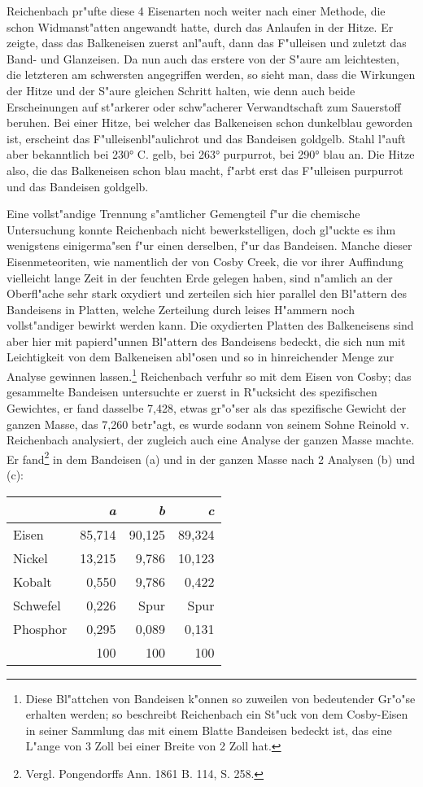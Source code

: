 \documentclass[a4paper, 11pt, oneside]{article}
\begin{document}
Reichenbach pr"ufte diese 4 Eisenarten noch weiter nach einer Methode, die schon Widmanst"atten angewandt hatte, durch das Anlaufen in der Hitze. Er zeigte, dass das Balkeneisen zuerst anl"auft, dann das F"ulleisen und zuletzt das Band- und Glanzeisen. Da nun auch das erstere von der S"aure am leichtesten, die letzteren am schwersten angegriffen werden, so sieht man, dass die Wirkungen der Hitze und der S"aure gleichen Schritt halten, wie denn auch beide Erscheinungen auf st"arkerer oder schw"acherer Verwandtschaft zum Sauerstoff beruhen. Bei einer Hitze, bei welcher das Balkeneisen schon dunkelblau geworden ist, erscheint das F"ulleisenbl"aulichrot und das Bandeisen goldgelb. Stahl l"auft aber bekanntlich bei 230° C. gelb, bei 263° purpurrot, bei 290° blau an. Die Hitze also, die das Balkeneisen schon blau macht, f"arbt erst das F"ulleisen purpurrot und das Bandeisen goldgelb.

Eine vollst"andige Trennung s"amtlicher Gemengteil f"ur die chemische Untersuchung konnte Reichenbach nicht bewerkstelligen, doch gl"uckte es ihm wenigstens einigerma"sen f"ur einen derselben, f"ur das Bandeisen. Manche dieser Eisenmeteoriten, wie namentlich der von Cosby Creek, die vor ihrer Auffindung vielleicht lange Zeit in der feuchten Erde gelegen haben, sind n"amlich an der Oberfl"ache sehr stark oxydiert und zerteilen sich hier parallel den Bl"attern des Bandeisens in Platten, welche Zerteilung durch leises H"ammern noch vollst"andiger bewirkt werden kann. Die oxydierten Platten des Balkeneisens sind aber hier mit papierd"unnen Bl"attern des Bandeisens bedeckt, die sich nun mit Leichtigkeit von dem Balkeneisen abl"osen und so in hinreichender Menge zur Analyse gewinnen lassen.\footnote{Diese Bl"attchen von Bandeisen k"onnen so zuweilen von bedeutender Gr"o"se erhalten werden; so beschreibt Reichenbach ein St"uck von dem Cosby-Eisen in seiner Sammlung das mit einem Blatte Bandeisen bedeckt ist, das eine L"ange von 3 Zoll bei einer Breite von 2 Zoll hat.} Reichenbach verfuhr so mit dem Eisen von Cosby; das gesammelte Bandeisen untersuchte er zuerst in R"ucksicht des spezifischen Gewichtes, er fand dasselbe 7,428, etwas gr"o"ser als das spezifische Gewicht der ganzen Masse, das 7,260 betr"agt, es wurde sodann von seinem Sohne Reinold v. Reichenbach analysiert, der zugleich auch eine Analyse der ganzen Masse machte. Er fand\footnote{Vergl. Pongendorffs Ann. 1861 B. 114, S. 258.} in dem Bandeisen (a) und in der ganzen Masse nach 2 Analysen (b) und (c):
\begin{center}
\begin{tabular}{ |l|r|r|r| }
    \hline
     & \emph{a} & \emph{b} & \emph{c}\\
    \hline\hline
    Eisen & 85,714 & 90,125 & 89,324\\\hline
    Nickel & 13,215 & 9,786 & 10,123\\\hline
    Kobalt & 0,550 & 9,786 & 0,422\\\hline
    Schwefel & 0,226 & Spur & Spur\\\hline
    Phosphor & 0,295 & 0,089 & 0,131\\\hline
     & 100 & 100 & 100\\
    \hline
\end{tabular}
\end{center}
\end{document}
